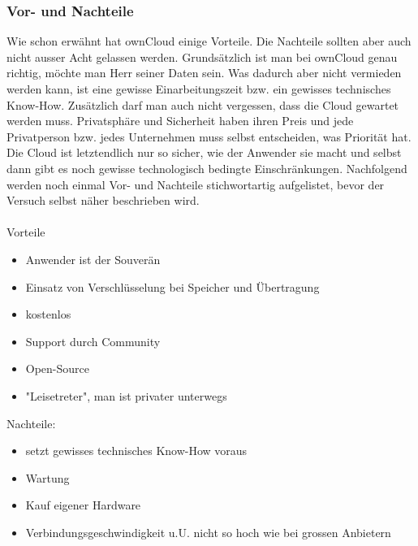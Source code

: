 \subsubsection{Vor- und Nachteile}
Wie schon erwähnt hat ownCloud einige Vorteile. Die Nachteile sollten aber auch nicht ausser Acht gelassen werden. Grundsätzlich ist man bei ownCloud genau richtig, möchte man Herr seiner Daten sein. Was dadurch aber nicht vermieden werden kann, ist eine gewisse Einarbeitungszeit bzw. ein gewisses technisches Know-How. Zusätzlich darf man auch nicht vergessen, dass die Cloud gewartet werden muss. Privatsphäre und Sicherheit haben ihren Preis und jede Privatperson bzw. jedes Unternehmen muss selbst entscheiden, was Priorität hat. Die Cloud ist letztendlich nur so sicher, wie der Anwender sie macht und selbst dann gibt es noch gewisse technologisch bedingte Einschränkungen.
Nachfolgend werden noch einmal Vor- und Nachteile stichwortartig aufgelistet, bevor der Versuch selbst näher beschrieben wird.
\\
\\
Vorteile
\begin{itemize}
\item Anwender ist der Souverän
\item Einsatz von Verschlüsselung bei Speicher und Übertragung
\item kostenlos
\item Support durch Community
\item Open-Source
\item "Leisetreter", man ist privater unterwegs
\end{itemize}

Nachteile:
\begin{itemize}
\item setzt gewisses technisches Know-How voraus
\item Wartung
\item Kauf eigener Hardware
\item Verbindungsgeschwindigkeit u.U. nicht so hoch wie bei grossen Anbietern
\end{itemize}

